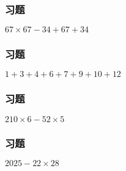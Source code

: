 \begin{frame}
    \frametitle{习题\theframecounter} 
    \vspace*{-3cm}   
    \centering\textit{\Large $67\times 67 - 34 + 67 + 34$}
\end{frame}

\begin{frame}
    \frametitle{习题\theframecounter} 
    \vspace*{-3cm}   
    \centering\textit{\Large $1+3+4+6+7+9+10 + 12$}
\end{frame}


\begin{frame}
    \frametitle{习题\theframecounter}
    \vspace*{-3cm}
    \centering\textit{\Large $210\times 6 - 52\times 5$}
\end{frame}


\begin{frame}
    \frametitle{习题\theframecounter}
    \vspace*{-3cm}
    \centering\textit{\Large $2025- 22\times 28$}
\end{frame}
